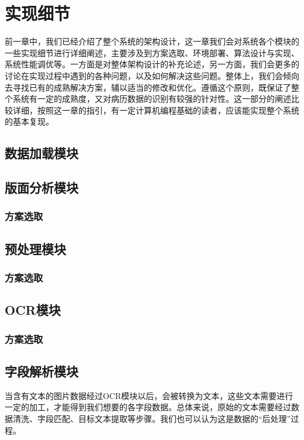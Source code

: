 \chapter{实现细节}
\label{chap:implements}
前一章中，我们已经介绍了整个系统的架构设计，这一章我们会对系统各个模块的一些实现细节进行详细阐述，主要涉及到方案选取、环境部署、算法设计与实现、系统性能调优等。一方面是对整体架构设计的补充论述，另一方面，我们会更多的讨论在实现过程中遇到的各种问题，以及如何解决这些问题。整体上，我们会倾向去寻找已有的成熟解决方案，辅以适当的修改和优化。遵循这个原则，既保证了整个系统有一定的成熟度，又对病历数据的识别有较强的针对性。这一部分的阐述比较详细，按照这一章的指引，有一定计算机编程基础的读者，应该能实现整个系统的基本复现。

\section{数据加载模块}  %

\section{版面分析模块}  %

\subsection{方案选取}
\section{预处理模块}     %
\subsection{方案选取}


\section{OCR模块}     %
\subsection{方案选取}

\section{字段解析模块}  %
当含有文本的图片数据经过OCR模块以后，会被转换为文本，这些文本需要进行一定的加工，才能得到我们想要的各字段数据。总体来说，原始的文本需要经过数据清洗、字段匹配、目标文本提取等步骤。我们也可以认为这是数据的“后处理”过程。

